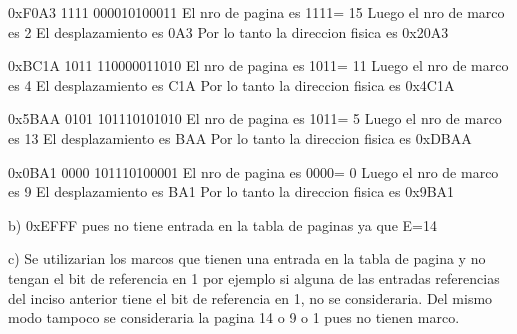 \documentclass[11pt]{article} %
\begin{document}
0xF0A3
1111 000010100011
\hfill \break
El nro de pagina es 1111= 15
Luego el nro de marco es 2
\hfill \break
El desplazamiento es 0A3
\hfill \break
Por lo tanto la direccion fisica es 0x20A3
\hfill \break

0xBC1A
1011 110000011010
\hfill \break
El nro de pagina es 1011= 11
Luego el nro de marco es 4
\hfill \break
El desplazamiento es C1A
\hfill \break
Por lo tanto la direccion fisica es 0x4C1A
\hfill \break


0x5BAA
0101  101110101010
\hfill \break
El nro de pagina es 1011= 5
Luego el nro de marco es 13
\hfill \break
El desplazamiento es BAA
\hfill \break
Por lo tanto la direccion fisica es 0xDBAA

\hfill \break

0x0BA1
0000 101110100001
\hfill \break
El nro de pagina es 0000= 0
Luego el nro de marco es 9
\hfill \break
El desplazamiento es BA1
\hfill \break
Por lo tanto la direccion fisica es 0x9BA1
\hfill \break


b) 0xEFFF pues no tiene entrada en la tabla de paginas ya que E=14
\hfill \break

c) Se utilizarian los marcos que tienen una entrada en la tabla de pagina y no tengan el bit de referencia en 1 por ejemplo si alguna de las entradas referencias del inciso anterior tiene el bit de referencia en 1, no se consideraria. Del mismo modo tampoco se consideraria la pagina 14 o 9 o 1 pues no tienen marco.
\end{document}
